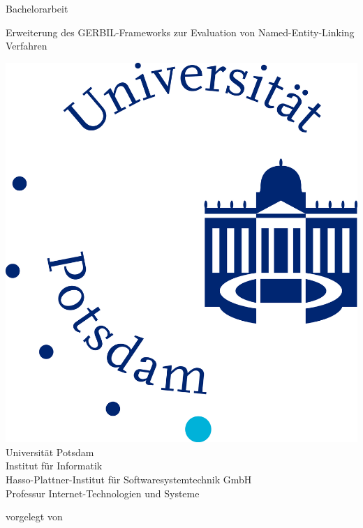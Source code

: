 \documentclass[11pt, a4paper]{article}
\begin{document}
          

\begin{titlepage}
  \begin{center} 
    \mbox{}
    
    {\large \sc Bachelorarbeit} \\    

    \vspace{1cm}
  
    {\huge Erweiterung des GERBIL-Frameworks zur Evaluation von Named-Entity-Linking Verfahren\\[1em] {\LARGE}}  
        
    \vspace{2cm}
    
    \includegraphics[scale=0.05]{images/Mathnatlogo.jpg}\\[1em]
    Universität Potsdam\\
    Institut für Informatik \\
    Hasso-Plattner-Institut für Softwaresystemtechnik GmbH\\
    Professur Internet-Technologien und Systeme
    
    \vspace{2cm}
    
		vorgelegt von
		

\end{center}
\end{titlepage}
\end{document}
